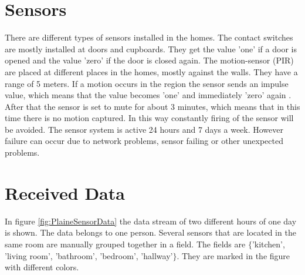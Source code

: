 \section{Sensors}
There are different types of sensors installed in the homes. The contact switches are mostly installed at doors and cupboards. They get the value 'one' if a door is opened and the value 'zero' if the door is closed again.
The motion-sensor (PIR) are placed at different places in the homes, mostly against the walls. They have a range of 5 meters. If a motion occurs in the region the sensor sends an impulse value, which means that the value becomes 'one' and immediately 'zero' again . After that the sensor is set to mute for about 3 minutes, which means that in this time there is no motion captured. In this way constantly firing of the sensor will be avoided. The sensor system is active 24 hours and 7 days a week. However failure can occur due to network problems, sensor failing or other unexpected problems.

\section{Received Data}
In figure \ref{fig:PlaineSensorData} the data stream of two different hours of one day is shown. The data belongs to one person. Several sensors that are located in the same room are manually grouped together in a field. The fields are $\{$'kitchen', 'living room', 'bathroom', 'bedroom', 'hallway'$\}$. They are marked in the figure with different colors.

